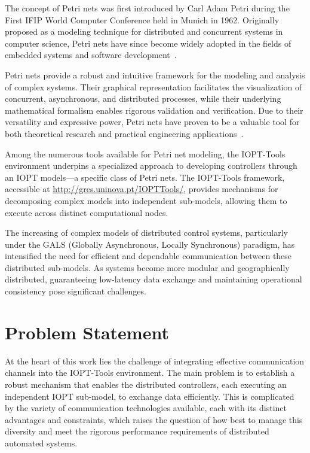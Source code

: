 The concept of Petri nets was first introduced by Carl Adam Petri during the First IFIP World Computer Conference held in Munich in 1962. Originally proposed as a modeling technique for distributed and concurrent systems in computer science, Petri nets have since become widely adopted in the fields of embedded systems and software development~\cite{adamCarlPetri}.

Petri nets provide a robust and intuitive framework for the modeling and analysis of complex systems. Their graphical representation facilitates the visualization of concurrent, asynchronous, and distributed processes, while their underlying mathematical formalism enables rigorous validation and verification. Due to their versatility and expressive power, Petri nets have proven to be a valuable tool for both theoretical research and practical engineering applications~\cite{murata}.

Among the numerous tools available for Petri net modeling, the IOPT-Tools environment underpins a specialized approach to developing controllers through an IOPT models—a specific class of Petri nets. The IOPT-Tools framework, accessible at \url{http://gres.uninova.pt/IOPTTools/}, provides mechanisms for decomposing complex models into independent sub-models, allowing them to execute across distinct computational nodes.

The increasing of complex models of distributed control systems, particularly under the GALS (Globally Asynchronous, Locally Synchronous) paradigm, has intensified the need for efficient and dependable communication between these distributed sub-models. As systems become more modular and geographically distributed, guaranteeing low-latency data exchange and maintaining operational consistency pose significant challenges. 

\section{Problem Statement}
\label{sec:problem_statement}


At the heart of this work lies the challenge of integrating effective communication channels into the IOPT-Tools environment. The main problem is to establish a robust mechanism that enables the distributed controllers, each executing an independent IOPT sub-model, to exchange data efficiently. This is complicated by the variety of communication technologies available, each with its distinct advantages and constraints, which raises the question of how best to manage this diversity and meet the rigorous performance requirements of distributed automated systems.

